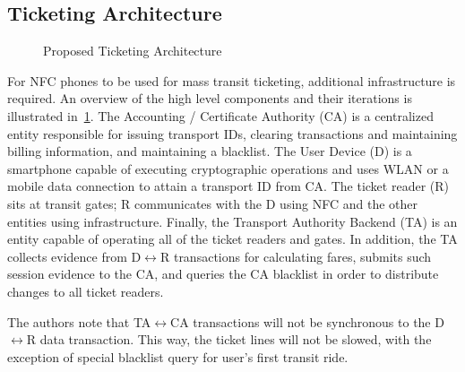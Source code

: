 \documentclass{sig-alternate}
\begin{document}
\subsection{Ticketing Architecture}
\begin{figure}
\centering
{}
\caption{Proposed Ticketing Architecture~\cite{Ticket2011}}
\label{fig:ticketingArch}
\end{figure}

For NFC phones to be used for mass transit ticketing, additional infrastructure is required. An overview of the high level components and their iterations is illustrated in~\ref{fig:ticketingArch}. The Accounting / Certificate Authority (CA) is a centralized entity responsible for issuing transport IDs, clearing transactions and maintaining billing information, and maintaining a blacklist. The User Device (D) is a smartphone capable of executing cryptographic operations and uses WLAN or a mobile data connection to attain a transport ID from CA. The ticket reader (R) sits at transit gates; R communicates with the D using NFC and the other entities using infrastructure. Finally, the Transport Authority Backend (TA) is an entity capable of operating all of the ticket readers and gates. In addition, the TA collects evidence from D$\leftrightarrow$R transactions for calculating fares, submits such session evidence to the CA, and queries the CA blacklist in order to distribute changes to all ticket readers.

The authors note that TA$\leftrightarrow$CA transactions will not be synchronous to the D$\leftrightarrow$R data transaction. This way, the ticket lines will not be slowed, with the exception of special blacklist query for user's first transit ride.
\end{document}

